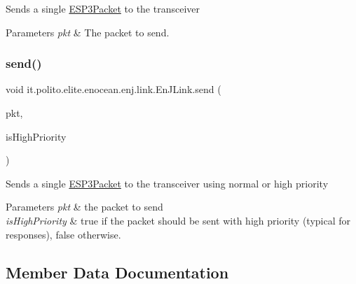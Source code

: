 Sends a single \hyperlink{}{E\+S\+P3\+Packet} to the transceiver


\begin{DoxyParams}{Parameters}
{\em pkt} & The packet to send. \\
\hline
\end{DoxyParams}
\hypertarget{classit_1_1polito_1_1elite_1_1enocean_1_1enj_1_1link_1_1_en_j_link_aa20997ac17e540b5f35cf9f8fdcde3c2}{}\label{classit_1_1polito_1_1elite_1_1enocean_1_1enj_1_1link_1_1_en_j_link_aa20997ac17e540b5f35cf9f8fdcde3c2} 
\subsubsection{\texorpdfstring{send()}{send()}\hspace{0.1cm}{\footnotesize\ttfamily [2/2]}}
{\footnotesize\ttfamily void it.\+polito.\+elite.\+enocean.\+enj.\+link.\+En\+J\+Link.\+send (\begin{DoxyParamCaption}\item[{\hyperlink{classit_1_1polito_1_1elite_1_1enocean_1_1protocol_1_1serial_1_1v3_1_1network_1_1packet_1_1_e_s_p3_packet}{E\+S\+P3\+Packet}}]{pkt,  }\item[{boolean}]{is\+High\+Priority }\end{DoxyParamCaption})}

Sends a single \hyperlink{}{E\+S\+P3\+Packet} to the transceiver using normal or high priority


\begin{DoxyParams}{Parameters}
{\em pkt} & the packet to send \\
\hline
{\em is\+High\+Priority} & true if the packet should be sent with high priority (typical for responses), false otherwise. \\
\hline
\end{DoxyParams}


\subsection{Member Data Documentation}
\hypertarget{classit_1_1polito_1_1elite_1_1enocean_1_1enj_1_1link_1_1_en_j_link_a6376bb54751bb2739c160ab28a5bdd27}{}\label{classit_1_1polito_1_1elite_1_1enocean_1_1enj_1_1link_1_1_en_j_link_a6376bb54751bb2739c160ab28a5bdd27} 
